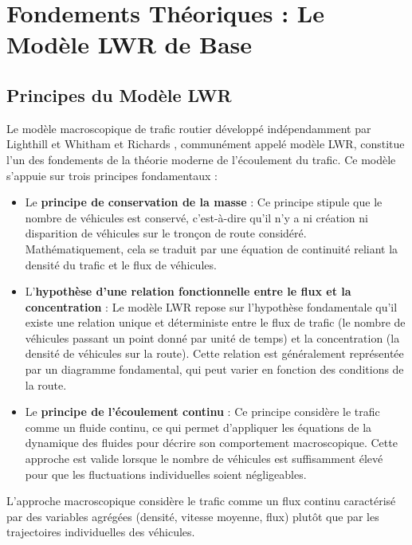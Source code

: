 \chapter{Fondements Théoriques : Le Modèle LWR de Base}
\label{chap:fondements_theoriques}

\section{Principes du Modèle LWR}
\label{sec:principes_lwr}

Le modèle macroscopique de trafic routier développé indépendamment par Lighthill et Whitham \cite{lighthill1955kinematic} et Richards \cite{richards1956shock}, communément appelé modèle LWR, constitue l'un des fondements de la théorie moderne de l'écoulement du trafic. Ce modèle s'appuie sur trois principes fondamentaux :

\begin{itemize}
    \item Le \textbf{principe de conservation de la masse}  : Ce principe stipule que le nombre de véhicules est conservé, c'est-à-dire qu'il n'y a ni création ni disparition de véhicules sur le tronçon de route considéré. Mathématiquement, cela se traduit par une équation de continuité reliant la densité du trafic et le flux de véhicules.
    \item L'\textbf{hypothèse d'une relation fonctionnelle entre le flux et la concentration}  : Le modèle LWR repose sur l'hypothèse fondamentale qu'il existe une relation unique et déterministe entre le flux de trafic (le nombre de véhicules passant un point donné par unité de temps) et la concentration (la densité de véhicules sur la route). Cette relation est généralement représentée par un diagramme fondamental, qui peut varier en fonction des conditions de la route.
    \item Le \textbf{principe de l'écoulement continu} : Ce principe considère le trafic comme un fluide continu, ce qui permet d'appliquer les équations de la dynamique des fluides pour décrire son comportement macroscopique. Cette approche est valide lorsque le nombre de véhicules est suffisamment élevé pour que les fluctuations individuelles soient négligeables.
\end{itemize}

\begin{definition}
    L'approche macroscopique considère le trafic comme un flux continu caractérisé par des variables agrégées (densité, vitesse moyenne, flux) plutôt que par les trajectoires individuelles des véhicules.
    \end{definition}
    
